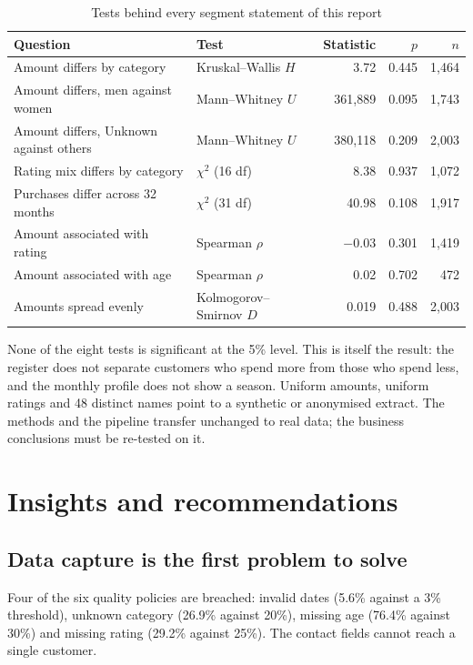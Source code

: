 \documentclass[12pt,a4paper]{article}
\begin{document}
\begin{table}[H]\centering\singlespacing
\caption{Tests behind every segment statement of this report}
\small
\begin{tabular}{@{}llrrr@{}}
\toprule
\textbf{Question} & \textbf{Test} & \textbf{Statistic} & \textbf{$p$} & \textbf{$n$} \\ \midrule
Amount differs by category & Kruskal--Wallis $H$ & 3.72 & 0.445 & 1{,}464 \\
Amount differs, men against women & Mann--Whitney $U$ & 361{,}889 & 0.095 & 1{,}743 \\
Amount differs, Unknown against others & Mann--Whitney $U$ & 380{,}118 & 0.209 & 2{,}003 \\
Rating mix differs by category & $\chi^2$ (16 df) & 8.38 & 0.937 & 1{,}072 \\
Purchases differ across 32 months & $\chi^2$ (31 df) & 40.98 & 0.108 & 1{,}917 \\
Amount associated with rating & Spearman $\rho$ & $-0.03$ & 0.301 & 1{,}419 \\
Amount associated with age & Spearman $\rho$ & 0.02 & 0.702 & 472 \\
Amounts spread evenly & Kolmogorov--Smirnov $D$ & 0.019 & 0.488 & 2{,}003 \\
\bottomrule
\end{tabular}
\end{table}

None of the eight tests is significant at the 5\% level. This is itself the result:
the register does not separate customers who spend more from those who spend less,
and the monthly profile does not show a season. Uniform amounts, uniform ratings and
48 distinct names point to a synthetic or anonymised extract. The methods and the
pipeline transfer unchanged to real data; the business conclusions must be re-tested
on it.

\section{Insights and recommendations}

\subsection{Data capture is the first problem to solve}

Four of the six quality policies are breached: invalid dates (5.6\% against a 3\%
threshold), unknown category (26.9\% against 20\%), missing age (76.4\% against 30\%)
and missing rating (29.2\% against 25\%). The contact fields cannot reach a single
customer.
\end{document}
